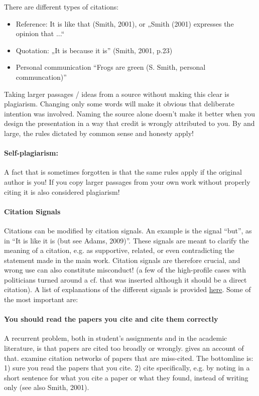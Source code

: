 \documentclass{tufte-book}
\begin{document}
There are different types of citations:

\begin{itemize}
\item Reference: It is like that (Smith, 2001), or „Smith (2001) expresses the opinion that ...“
\item Quotation: „It is because it is” (Smith, 2001, p.23)
\item Personal communication “Frogs are green (S. Smith, personal communcation)”
\end{itemize}

Taking larger passages / ideas from a source without making this clear is plagiarism. Changing only some words will make it obvious that deliberate intention was involved. Naming the source alone doesn’t make it better when you design the presentation in a way that credit is wrongly attributed to you. By and large, the rules dictated by common sense and honesty apply!

\paragraph{Self-plagiarism:} A fact that is sometimes forgotten is that the same rules apply if the original author is you! If you copy larger passages from your own work without properly citing it is also considered plagiarism! 

\paragraph{Citation Signals} Citations can be modified by citation signals. An example is the signal ``but'', as in ``It is like it is (but see Adams, 2009)”. These signals are meant to clarify the meaning of a citation, e.g. as supportive, related, or even contradicting the statement made in the main work. Citation signals are therefore crucial, and wrong use can also constitute misconduct! (a few of the high-profile cases with politicians turned around a cf. that was inserted although it should be a direct citation). A list of explanations of the different signals is provided \href{http://en.wikipedia.org/wiki/Citation_signal}{here}. Some of the most important are:

\paragraph{You should read the papers you cite and cite them correctly} A recurrent problem, both in student's assignments and in the academic literature, is that papers are cited too broadly or wrongly. \citet{Editorial-Causecorrelationconjecture-2015} gives an account of that. \citet{Greenberg-Howcitationdistortions-2009} examine citation networks of papers that are miss-cited. The bottomline is: 1) sure you read the papers that you cite. 2) cite specifically, e.g. by noting in a short sentence for what you cite a paper or what they found, instead of writing only (see also Smith, 2001). 
\end{document}
